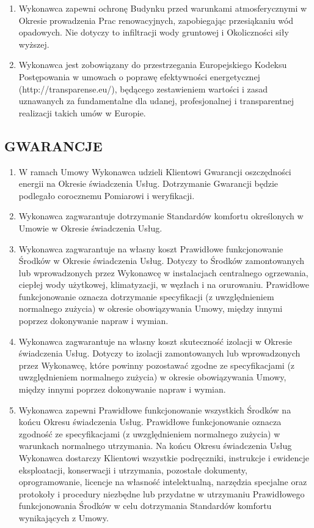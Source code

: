 \begin{multicols}{2}
\begin{enumerate}
	\item Wykonawca  zapewni  ochronę Budynku przed warunkami atmosferycznymi   w   Okresie   prowadzenia Prac   renowacyjnych,   zapobiegając przesiąkaniu wód opadowych. Nie dotyczy to infiltracji wody gruntowej i Okoliczności siły wyższej.
	\item Wykonawca jest zobowiązany do przestrzegania Europejskiego Kodeksu Postępowania w umowach o poprawę efektywności energetycznej (http://transparense.eu/), będącego zestawieniem wartości i zasad uznawanych za fundamentalne dla udanej, profesjonalnej i transparentnej realizacji takich umów w Europie.
\end{enumerate}


\subsection{GWARANCJE}
\begin{enumerate}
	\item W ramach Umowy Wykonawca udzieli Klientowi Gwarancji oszczędności energii na Okresie świadczenia Usług. Dotrzymanie Gwarancji będzie podlegało corocznemu Pomiarowi i weryfikacji.
	\item Wykonawca zagwarantuje dotrzymanie Standardów komfortu określonych w Umowie w Okresie świadczenia Usług.
	\item Wykonawca zagwarantuje na własny koszt Prawidłowe funkcjonowanie Środków w Okresie świadczenia Usług. Dotyczy to Środków zamontowanych lub wprowadzonych przez Wykonawcę w instalacjach centralnego ogrzewania, ciepłej wody użytkowej, klimatyzacji, w węzłach i na orurowaniu. Prawidłowe funkcjonowanie oznacza dotrzymanie specyfikacji (z uwzględnieniem normalnego zużycia) w okresie obowiązywania Umowy, między innymi poprzez dokonywanie napraw i wymian.
	\item Wykonawca zagwarantuje na własny koszt skuteczność izolacji w Okresie świadczenia Usług. Dotyczy to izolacji zamontowanych lub wprowadzonych przez Wykonawcę, które powinny pozostawać zgodne ze specyfikacjami (z uwzględnieniem normalnego zużycia) w okresie obowiązywania Umowy, między innymi poprzez dokonywanie napraw i wymian.
	\item Wykonawca zapewni Prawidłowe funkcjonowanie wszystkich Środków na końcu Okresu świadczenia Usług. Prawidłowe funkcjonowanie oznacza zgodność ze specyfikacjami (z uwzględnieniem normalnego zużycia) w warunkach normalnego utrzymania. Na końcu Okresu świadczenia Usług Wykonawca dostarczy Klientowi wszystkie podręczniki, instrukcje i ewidencje eksploatacji, konserwacji i utrzymania, pozostałe dokumenty, oprogramowanie, licencje na własność intelektualną, narzędzia specjalne oraz protokoły i procedury niezbędne lub przydatne w utrzymaniu Prawidłowego funkcjonowania Środków w celu dotrzymania Standardów komfortu wynikających z Umowy.

\end{enumerate}
\end{multicols}
